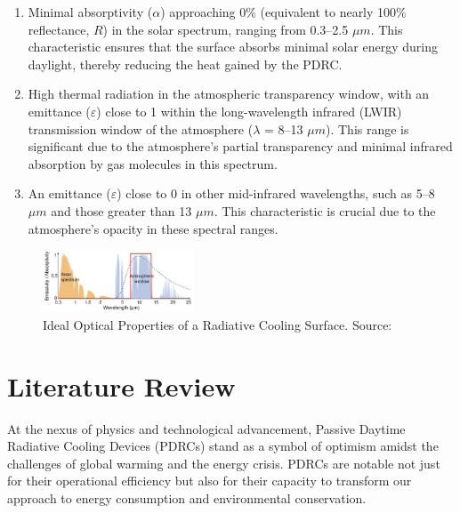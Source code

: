 \begin{enumerate} 
\item Minimal absorptivity ($\alpha$) approaching 0\% (equivalent to nearly 100\% reflectance, $R$) in the solar spectrum, ranging from 0.3–2.5 $\mu m$. This characteristic ensures that the surface absorbs minimal solar energy during daylight, thereby reducing the heat gained by the PDRC.
\item High thermal radiation in the atmospheric transparency window, with an emittance ($\varepsilon$) close to 1 within the long-wavelength infrared (LWIR) transmission window of the atmosphere ($\lambda$ = 8–13 $\mu m$). This range is significant due to the atmosphere's partial transparency and minimal infrared absorption by gas molecules in this spectrum.
\item An emittance ($\varepsilon$) close to 0 in other mid-infrared wavelengths, such as 5–8 $\mu m$ and those greater than 13 $\mu m$. This characteristic is crucial due to the atmosphere's opacity in these spectral ranges.
\end{enumerate}

\begin{figure}[ht!]
  \centering
  \includegraphics[width=0.4\textwidth]{Chapters/Figures/Ideal Optical Properties of a Radiative Cooling Surface.jpg}
  \caption[Ideal Optical Properties of a Radiative Cooling Surface]{Ideal Optical Properties of a Radiative Cooling Surface. Source: \cite{yang_passive_2020}}
  \label{fig:ideal_PDRC_properties}
\end{figure}



\section{Literature Review}
At the nexus of physics and technological advancement, Passive Daytime Radiative Cooling Devices (PDRCs) stand as a symbol of optimism amidst the challenges of global warming and the energy crisis. PDRCs are notable not just for their operational efficiency but also for their capacity to transform our approach to energy consumption and environmental conservation.

